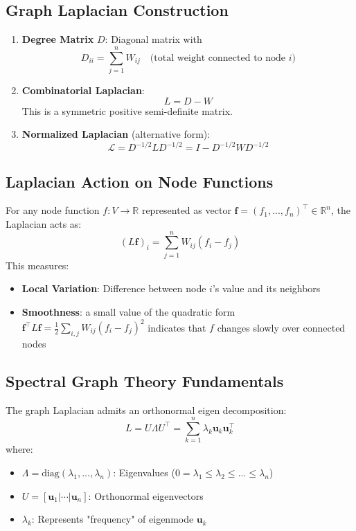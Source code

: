 \begin{notechapter}
\subsection{Graph Laplacian Construction}
\begin{enumerate}
    \item \textbf{Degree Matrix} $D$: Diagonal matrix with
        \[
        D_{ii} = \sum_{j=1}^n W_{ij} \quad \text{(total weight connected to node $i$)}
        \]
        
    \item \textbf{Combinatorial Laplacian}:
        \[
        L = D - W
        \]
        This is a symmetric positive semi-definite matrix.

    \item \textbf{Normalized Laplacian} (alternative form):
        \[
        \mathcal{L} = D^{-1/2}LD^{-1/2} = I - D^{-1/2}WD^{-1/2}
        \]
\end{enumerate}

\subsection{Laplacian Action on Node Functions}
For any node function $f: V \to \mathbb{R}$ represented as vector 
$\mathbf{f} = (f_1,...,f_n)^\top \in \mathbb{R}^n$, the Laplacian acts as:
\[
(L\mathbf{f})_i = \sum_{j=1}^n W_{ij}(f_i - f_j)
\]
This measures:
\begin{itemize}
    \item \textbf{Local Variation}: Difference between node $i$'s value 
        and its neighbors
        \item \textbf{Smoothness}: a small value of the quadratic form
        $\mathbf{f}^\top L \mathbf{f} = \frac{1}{2}\sum_{i,j} W_{ij}(f_i - f_j)^2$ indicates that $f$ changes
        slowly over connected nodes
\end{itemize}

\subsection{Spectral Graph Theory Fundamentals}

\begin{theorem}
The graph Laplacian admits an orthonormal eigen decomposition:
\[
L = U\Lambda U^\top = \sum_{k=1}^n \lambda_k \mathbf{u}_k \mathbf{u}_k^\top
\]
where:
\begin{itemize}
    \item $\Lambda = \text{diag}(\lambda_1,...,\lambda_n)$: Eigenvalues 
        ($0 = \lambda_1 \leq \lambda_2 \leq ... \leq \lambda_n$)
    \item $U = [\mathbf{u}_1|\cdots|\mathbf{u}_n]$: Orthonormal eigenvectors
    \item $\lambda_k$: Represents "frequency" of eigenmode $\mathbf{u}_k$
\end{itemize}
\end{theorem}


\end{notechapter}
